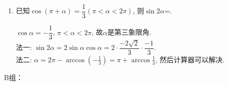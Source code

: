 \begin{enumerate}
\begin{jieda}
\begin{align*}
    & = (2cos^2\theta - 1)cos\theta - 2sin^2\theta cos\theta \\
    & = 2cos^3\theta - cos\theta - 2(1-cos^2\theta)cos\theta \\
    & = 4cos^3\theta - 3cos\theta.
    \end{align*}
\end{jieda}
\item 已知$\cos(\pi+\alpha)=\dfrac{1}{3}(\pi<\alpha<2\pi)$, 则$\sin2\alpha$=. 
\begin{jieda}
$\cos\alpha=-\dfrac{1}{3}$, $\pi<\alpha<2\pi$, 故$\alpha$是第三象限角. \\
法一: $\sin2\alpha=2\sin\alpha\cos\alpha=2\cdot\dfrac{-2\sqrt{2}}{3}\cdot\dfrac{-1}{3}$. \\
法二: $\alpha=2\pi-\arccos(-\frac{1}{3})=\pi+\arccos\frac{1}{3}$, 然后计算器可以解决. 
\end{jieda}
\end{enumerate}
B组：
